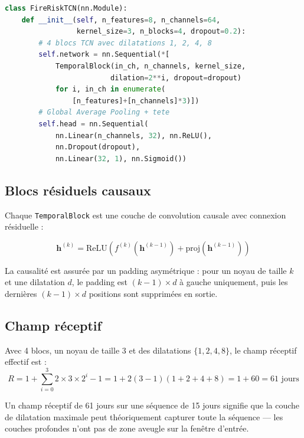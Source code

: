 \documentclass[12pt,a4paper]{report}
\begin{document}
\begin{tcnbox}[title=Architecture FireRiskTCN]
\begin{lstlisting}[language=Python,backgroundcolor=\color{tcnRed!5}]
class FireRiskTCN(nn.Module):
    def __init__(self, n_features=8, n_channels=64,
                 kernel_size=3, n_blocks=4, dropout=0.2):
        # 4 blocs TCN avec dilatations 1, 2, 4, 8
        self.network = nn.Sequential(*[
            TemporalBlock(in_ch, n_channels, kernel_size,
                         dilation=2**i, dropout=dropout)
            for i, in_ch in enumerate(
                [n_features]+[n_channels]*3)])
        # Global Average Pooling + tete
        self.head = nn.Sequential(
            nn.Linear(n_channels, 32), nn.ReLU(),
            nn.Dropout(dropout),
            nn.Linear(32, 1), nn.Sigmoid())
\end{lstlisting}
\end{tcnbox}

\subsection{Blocs résiduels causaux}

Chaque \texttt{TemporalBlock} est une couche de convolution causale avec connexion résiduelle :

\begin{equation}
  \mathbf{h}^{(k)} = \text{ReLU}\!\left(f^{(k)}(\mathbf{h}^{(k-1)}) + \text{proj}(\mathbf{h}^{(k-1)})\right)
\end{equation}

La causalité est assurée par un padding asymétrique : pour un noyau de taille $k$ et
une dilatation $d$, le padding est $(k-1) \times d$ à gauche uniquement, puis les
dernières $(k-1) \times d$ positions sont supprimées en sortie.

\subsection{Champ réceptif}

Avec 4 blocs, un noyau de taille 3 et des dilatations $\{1, 2, 4, 8\}$, le champ
réceptif effectif est :
\begin{equation}
  R = 1 + \sum_{i=0}^{3} 2 \times 3 \times 2^i - 1 = 1 + 2(3-1)(1+2+4+8) = 1 + 60 = 61 \text{ jours}
\end{equation}

Un champ réceptif de 61 jours sur une séquence de 15 jours signifie que la couche de
dilatation maximale peut théoriquement capturer toute la séquence — les couches
profondes n'ont pas de zone aveugle sur la fenêtre d'entrée.
\end{document}
